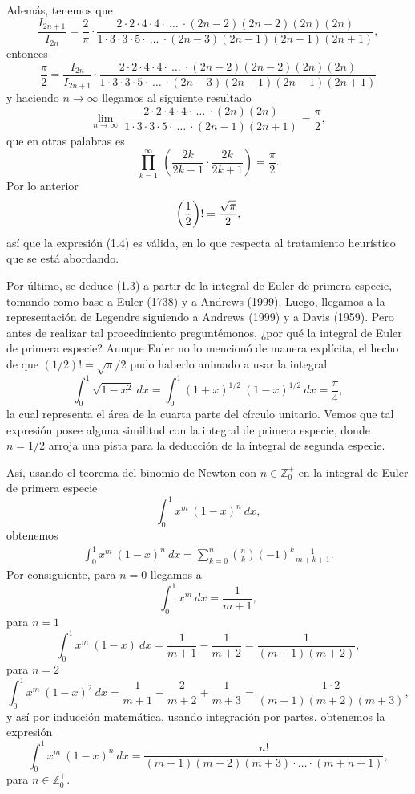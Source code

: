 Además, tenemos que $$\frac{I_{2n+1}}{I_{2n}} = \frac{2}{\pi}\cdot\frac{2\cdot2\cdot4\cdot4\cdot\ \dots\ \cdot(2n-2)(2n-2)(2n)(2n)}{1\cdot3\cdot3\cdot5\cdot\ \dots\ \cdot(2n-3)(2n-1)(2n-1)(2n+1)},$$ entonces
$$\frac{\pi}{2} = \frac{I_{2n}}{I_{2n+1}}\cdot\frac{2\cdot2\cdot4\cdot4\cdot\ \dots\ \cdot(2n-2)(2n-2)(2n)(2n)}{1\cdot3\cdot3\cdot5\cdot\ \dots\ \cdot(2n-3)(2n-1)(2n-1)(2n+1)}$$ y haciendo $n\rightarrow\infty$ llegamos al siguiente resultado $$\lim_{n \rightarrow \infty}\ \frac{2\cdot2\cdot4\cdot4\cdot\ \dots\ \cdot(2n)(2n)}{1\cdot3\cdot3\cdot5\cdot\ \dots\ \cdot(2n-1)(2n+1)} = \frac{\pi}{2},$$ que en otras palabras es $$\prod_{k = 1}^{\infty}\ \left(\frac{2k}{2k-1}\cdot\frac{2k}{2k+1}\right) = \frac{\pi}{2}.$$ Por lo anterior  $$\left({1 \over 2}\right)! = {\sqrt{\pi}\over 2},$$ 
así que la expresión (1.4) es válida, en lo que respecta al tratamiento heurístico que se está abordando.
 
Por último, se deduce (1.3) a partir de la integral de Euler de primera especie, tomando como base a Euler (1738) y a Andrews (1999). Luego, llegamos a la representación de Legendre siguiendo a Andrews (1999) y a Davis (1959). Pero antes de realizar tal procedimiento preguntémonos, ¿por qué la integral de Euler de primera especie? Aunque Euler no lo mencionó de manera explícita, el hecho de que $(1/2)! = \sqrt{\pi}/2$ pudo haberlo animado a usar la integral $$\int_{0}^{1}\sqrt{1-x^2}\ dx = \int_{0}^{1}(1+x)^{1/2}\ (1-x)^{1/2}\ dx = \frac{\pi}{4},$$ la cual representa el área de la cuarta parte del círculo unitario. Vemos que tal expresión posee alguna similitud con la integral de primera especie, donde $n = 1/2$ arroja una pista para la deducción de la integral de segunda especie.

Así, usando el teorema del binomio de Newton con $n \in \mathbb{Z}_0^+$ en la integral de Euler de primera especie $$\int_{0}^{1}x^m\ (1-x)^n\ dx,$$ obtenemos
\begin{align*}
	\int_{0}^{1} x^m\ (1-x)^n\ dx = \sum_{k = 0}^{n}\binom{n}{k}(-1)^k\frac{1}{m+k+1}.
\end{align*}
Por consiguiente, para $n = 0$ llegamos a $$\int_{0}^{1}x^m\ dx = \frac{1}{m+1},$$
para $n = 1$
$$\int_{0}^{1}x^m\ (1-x)\ dx = \frac{1}{m+1} - \frac{1}{m+2} = \frac{1}{(m+1)(m+2)},$$
para $n = 2$
$$\int_{0}^{1}x^m\ (1-x)^2\ dx = \frac{1}{m+1} - \frac{2}{m+2} + \frac{1}{m+3} = \frac{1 \cdot 2}{(m+1)(m+2)(m+3)},$$
y así por inducción matemática, usando integración por partes, obtenemos la expresión $$\int_{0}^{1}x^m\ (1-x)^n\ dx = \frac{n!}{(m+1)(m+2)(m+3) \cdot \ldots \cdot (m+n+1)},$$ para $n \in \mathbb{Z}_0^+.$

